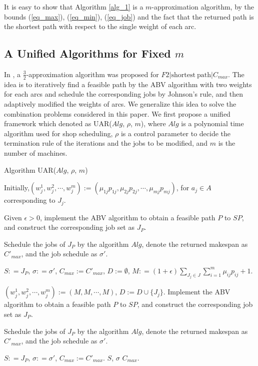 \documentclass{llncs}
\numberwithin{subcase}{case}
\begin{document}
It is easy to show that Algorithm \ref{alg_1} is a $m$-approximation algorithm,
by the bounds (\ref{eq_max}), (\ref{eq_min}), (\ref{eq_job}) and the fact that the returned path is the shortest path with respect to the single weight of each arc.



\subsection{A Unified Algorithms for Fixed $m$}\label{sec_alg_im}
In \cite{NW13}, a $\frac{3}{2}$-approximation algorithm was proposed for $F2|\mathrm{shortest}~\mathrm{path}|C_{max}$. The idea is to iteratively find a feasible path by the ABV algorithm with two weights for each arcs and schedule the corresponding jobs by Johnson's rule, and then adaptively modified the weights of arcs. We generalize this idea to solve the combination problems considered in this paper. We first propose a unified framework which denoted as UAR($Alg$, $\rho$, $m$), where $Alg$ is a polynomial time algorithm used for shop scheduling, $\rho$ is a control parameter to decide the termination rule of the iterations and the jobs to be modified, and $m$ is the number of machines.

\begin{algorithm}[htb]
\caption{Algorithm UAR($Alg$, $\rho$, $m$)}
\label{alg_uar}
\begin{algorithmic}[1]
\STATE Initially,$(w^1_j, w^2_j, \cdots, w^m_j) :=(\mu_{1j}p_{1j}, \mu_{2j}p_{2j}, \cdots, \mu_{mj}p_{mj})$, for $a_j\in A$ corresponding to $J_j$.

\STATE Given $\epsilon >0$, implement the ABV algorithm to obtain a feasible path $P$ to $SP$, and construct the corresponding job set as $J_P$.

\STATE Schedule the jobs of $J_P$ by the algorithm $Alg$, denote the returned makespan as $C'_{max}$, and the job schedule as $\sigma'$.

\STATE $S : = J_P$, $\sigma: = \sigma'$, $C_{max}:=C'_{max}$, $D:=\emptyset$, $M : = (1+\epsilon)\sum_{J_j\in J}\sum_{i = 1}^{m}\mu_{ij}p_{ij} + 1$.

        \STATE $(w^1_j, w^2_j, \cdots, w^m_j) := (M, M, \cdots, M)$, $D := D\cup \{J_j\}$.
    \ENDFOR
    \STATE Implement the ABV algorithm to obtain a feasible path $P$ to $SP$, and construct the corresponding job set as $J_P$.

    \STATE Schedule the jobs of $J_P$ by the algorithm $Alg$, denote the returned makespan as $C'_{max}$, and the job schedule as $\sigma'$.

        \STATE $S : = J_P$, $\sigma: = \sigma'$, $C_{max}:=C'_{max}$.
    \ENDIF
\ENDWHILE
\RETURN $S$, $\sigma$ \AND $C_{max}$.
\end{algorithmic}
\end{algorithm}
\end{document}
